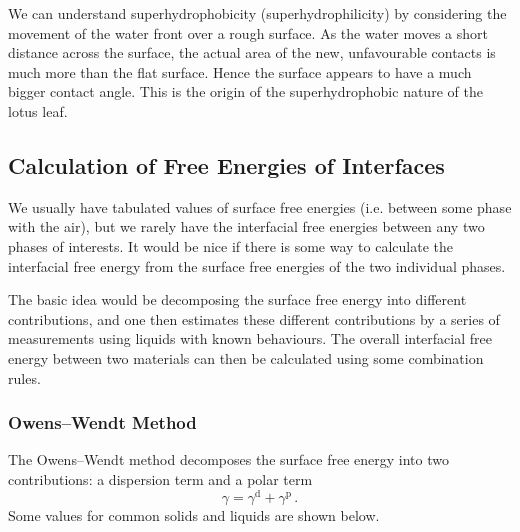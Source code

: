 \documentclass{article}
\theoremstyle{plain}\theoremheaderfont{\normalfont\itshape}\theorembodyfont{\rmfamily}\theoremseparator{.}\newtheorem*{rem}{Remark}\newtheorem*{ex}{Example}\newtheorem*{proof}{Proof}\newtheorem*{altp}{Alternative proof}
\theoremstyle{plain}\theoremheaderfont{\normalfont\bfseries}\theorembodyfont{\rmfamily}\theoremseparator{.}\newtheorem{thm}{Theorem}[section]\newtheorem{lem}[thm]{Lemma}\newtheorem{prop}[thm]{Proposition}\newtheorem*{cor}{Corollary}\newtheorem{defn}[thm]{Definition}\newtheorem{clm}[thm]{Claim}\newtheorem{clminproof}{Claim}\newtheorem*{law}{Law}\newtheorem{pos}[thm]{Postulate}
\theoremstyle{break}\theoremheaderfont{\normalfont\itshape}\theorembodyfont{\rmfamily}\theoremseparator{.\medskip}\newtheorem*{proofskip}{Proof}\newtheorem*{exs}{Examples}\newtheorem*{rems}{Remarks}
\theoremstyle{break}\theoremheaderfont{\normalfont\bfseries}\theorembodyfont{\rmfamily}\theoremseparator{.\medskip}\newtheorem{lemskip}[thm]{Lemma}\newtheorem{defnskip}[thm]{Definition}\newtheorem{propskip}[thm]{Proposition}\newtheorem{thmskip}[thm]{Theorem}
\numberwithin{equation}{section}
\begin{document}
	We can understand superhydrophobicity (superhydrophilicity) by considering the movement of the water front over a rough surface. As the water moves a short distance across the surface, the actual area of the new, unfavourable contacts is much more than the flat surface. Hence the surface appears to have a much bigger contact angle. This is the origin of the superhydrophobic nature of the lotus leaf.

	\subsection{Calculation of Free Energies of Interfaces}
	We usually have tabulated values of surface free energies (i.e. between some phase with the air), but we rarely have the interfacial free energies between any two phases of interests. It would be nice if there is some way to calculate the interfacial free energy from the surface free energies of the two individual phases.

	The basic idea would be decomposing the surface free energy into different contributions, and one then estimates these different contributions by a series of measurements using liquids with known behaviours. The overall interfacial free energy between two materials can then be calculated using some combination rules.

	\subsubsection{Owens--Wendt Method}
	The Owens--Wendt method decomposes the surface free energy into two contributions: a dispersion term and a polar term
	\begin{equation}
		\gamma=\gamma^{\text{d}}+\gamma^{\text{p}}\,.
	\end{equation}
	Some values for common solids and liquids are shown below.
\end{document}
